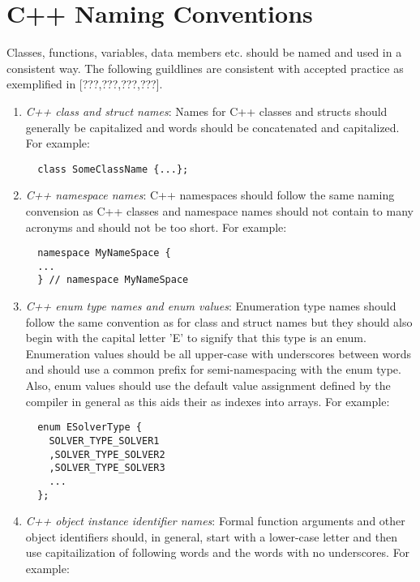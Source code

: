 
%
\section{C++ Naming Conventions}
%

Classes, functions, variables, data members etc. should be named and used in a
consistent way.  The following guildlines are consistent with accepted
practice as exemplified in [???,???,???,???].

\begin{enumerate}

{}\item\textit{C++ class and struct names}: Names for C++ classes and structs
should generally be capitalized and words should be concatenated and
capitalized.  For example:

\begin{verbatim}
  class SomeClassName {...};
\end{verbatim}

{}\item\textit{C++ namespace names}: C++ namespaces should follow the same
naming convension as C++ classes and namespace names should not contain to
many acronyms and should not be too short.  For example:

\begin{verbatim}
  namespace MyNameSpace {
  ...
  } // namespace MyNameSpace 
\end{verbatim}

{}\item\textit{C++ enum type names and enum values}: Enumeration type names
should follow the same convention as for class and struct names but they
should also begin with the capital letter 'E' to signify that this type is an
enum.  Enumeration values should be all upper-case with underscores between
words and should use a common prefix for semi-namespacing with the enum type.
Also, enum values should use the default value assignment defined by the
compiler in general as this aids their as indexes into arrays.  For example:

\begin{verbatim}
  enum ESolverType {
    SOLVER_TYPE_SOLVER1
    ,SOLVER_TYPE_SOLVER2
    ,SOLVER_TYPE_SOLVER3
    ...
  };
\end{verbatim}

{}\item\textit{C++ object instance identifier names}: Formal function
arguments and other object identifiers should, in general, start with a
lower-case letter and then use capitailization of following words and the
words with no underscores.  For example:


\end{enumerate}

